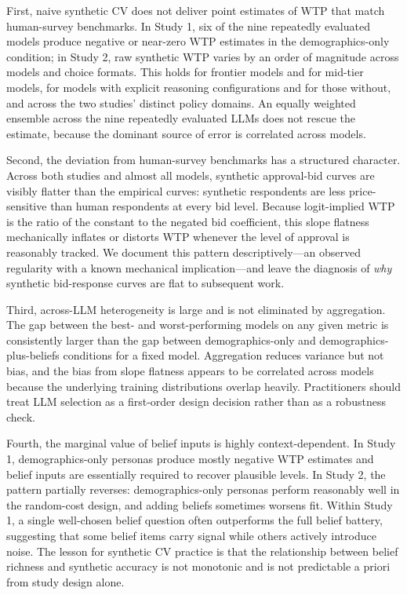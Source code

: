 \documentclass[12pt]{article}
\begin{document}
First, naive synthetic CV does not deliver point estimates of WTP that
match human-survey benchmarks. In Study 1, six of the nine repeatedly
evaluated models produce negative or near-zero WTP estimates in the
demographics-only condition; in Study 2, raw synthetic WTP varies by an
order of magnitude across models and choice formats. This holds for
frontier models and for mid-tier models, for models with explicit reasoning
configurations and for those without, and across the two studies' distinct
policy domains. An equally weighted ensemble across the nine repeatedly
evaluated LLMs does not rescue the estimate, because the dominant source
of error is correlated across models.

Second, the deviation from human-survey benchmarks has a structured
character. Across both studies and almost all models, synthetic
approval-bid curves are visibly flatter than the empirical curves: synthetic
respondents are less price-sensitive than human respondents at every bid
level. Because logit-implied WTP is the ratio of the constant to the
negated bid coefficient, this slope flatness mechanically inflates or
distorts WTP whenever the level of approval is reasonably tracked. We
document this pattern descriptively---an observed regularity with a known
mechanical implication---and leave the diagnosis of \emph{why} synthetic
bid-response curves are flat to subsequent work.

Third, across-LLM heterogeneity is large and is not eliminated by
aggregation. The gap between the best- and worst-performing models on any
given metric is consistently larger than the gap between demographics-only
and demographics-plus-beliefs conditions for a fixed model. Aggregation
reduces variance but not bias, and the bias from slope flatness appears
to be correlated across models because the underlying training distributions
overlap heavily. Practitioners should treat LLM selection as a first-order
design decision rather than as a robustness check.

Fourth, the marginal value of belief inputs is highly context-dependent.
In Study 1, demographics-only personas produce mostly negative WTP
estimates and belief inputs are essentially required to recover plausible
levels. In Study 2, the pattern partially reverses: demographics-only
personas perform reasonably well in the random-cost design, and adding
beliefs sometimes worsens fit. Within Study 1, a single well-chosen belief
question often outperforms the full belief battery, suggesting that some
belief items carry signal while others actively introduce noise. The
lesson for synthetic CV practice is that the relationship between belief
richness and synthetic accuracy is not monotonic and is not predictable
a priori from study design alone.
\end{document}

